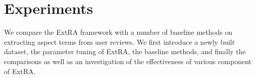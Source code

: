\section{Experiments}
\label{sec:experiments}
We compare the ExtRA framework with a number of 
baseline methods on extracting  aspect terms from user reviews. 
We first introduce a newly built dataset, the parameter tuning of ExtRA, the baseline methods, and finally the comparisons as well as 
an investigation of the effectiveness of various component of ExtRA.


%
%

